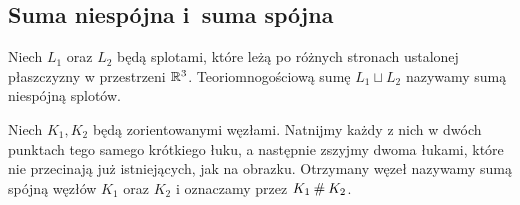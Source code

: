 \subsection{Suma niespójna i~suma spójna}

\begin{definition}
%
    Niech $L_1$ oraz $L_2$ będą splotami, które leżą po różnych stronach ustalonej płaszczyzny w przestrzeni $\mathbb R^3$.
    Teoriomnogościową sumę $L_1 \sqcup L_2$ nazywamy sumą niespójną splotów.
\end{definition}

\begin{definition}
%
    Niech $K_1, K_2$ będą zorientowanymi węzłami.
    Natnijmy każdy z nich w dwóch punktach tego samego krótkiego łuku, a następnie zszyjmy dwoma łukami, które nie przecinają już istniejących, jak na obrazku.
    Otrzymany węzeł nazywamy sumą spójną węzłów $K_1$ oraz $K_2$ i oznaczamy przez $K_1 \mathbin{\#} K_2$.
\begin{comment}
    \[
        \begin{tikzpicture}[baseline=-0.65ex,scale=0.1]
        \begin{knot}[clip width=5, flip crossing/.list={5}, ignore endpoint intersections=false,]
            \strand[thick] (-3.5, -3.5) [in=down, out=up] to (3.5, 3.5);
            \strand[thick] (3.5, 3.5) [in=right, out=up] to (-4.5, 10);
            \strand[thick] (-4.5, 10) [in=up, out=left] to (-10, 3.5);
            \strand[thick] (-10, 3.5) to (-10, -3.5);
            \strand[thick] (-10, -3.5) [in=left, out=down] to (-4.5, -10);
            \strand[thick] (-4.5, -10) [in=down, out=right] to (3.5, -3.5);
            \strand[thick] (3.5, -3.5) [in=down, out=up] to (-3.5, 3.5);
            \strand[thick] (-3.5, 3.5) [in=left, out=up] to (4.5, 10);
            \strand[thick] (4.5, 10) [in=up, out=right] to (10, 3.5);
            \strand[thick, -Latex] (10, 3.5) to (10, -3.5);
            \strand[thick] (10, -3.5) [in=right, out=down] to (4.5, -10);
            \strand[thick] (4.5, -10) [in=down, out=left] to (-3.5, -3.5);
            \node at (0, -15) {$K_1$};
        \end{knot}
        \end{tikzpicture}
        \shrap
        \begin{tikzpicture}[baseline=-0.65ex,scale=0.1]
        \begin{knot}[clip width=5, flip crossing/.list={6}, ignore endpoint intersections=false,]

\end{comment}
\end{definition}
